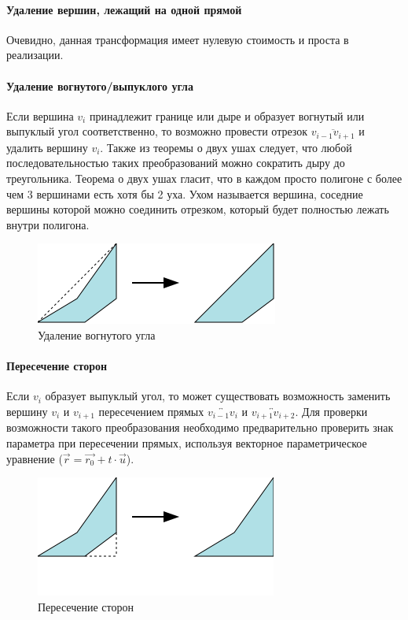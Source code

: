 \documentclass{fefu_thesis/cls/fefu}
\newcommand*\gsegment[1]{\overline{#1}}
\newcommand*\gline[1]{\overleftrightarrow{#1}}
\begin{document}
    \paragraph{Удаление вершин, лежащий на одной прямой}
    Очевидно, данная трансформация имеет нулевую стоимость и проста в реализации.
    \paragraph{Удаление вогнутого/выпуклого угла}
    Если вершина $v_i$ принадлежит границе или дыре и образует вогнутый или выпуклый угол соответственно, то возможно провести отрезок $\gsegment{v_{i - 1}v_{i + 1}}$ и удалить вершину $v_i$. Также из теоремы о двух ушах следует, что любой последовательностью  таких преобразований можно сократить дыру до треугольника. Теорема о двух ушах гласит, что в каждом просто полигоне с более чем 3 вершинами есть хотя бы 2 уха. Ухом называется вершина, соседние вершины которой можно соединить отрезком, который будет полностью лежать внутри полигона.

    \begin{figure}[H]
        \centering
        \includegraphics[scale=1]{images/earcut.png}
        \caption{Удаление вогнутого угла}
    \end{figure}
    \paragraph{Пересечение сторон}
    Если $v_i$ образует выпуклый угол, то может существовать возможность заменить вершину $v_i$ и $v_{i + 1}$ пересечением прямых $\gline{v_{i - 1}v_i}$ и $\gline{v_{i + 1}v_{i + 2}}$. Для проверки возможности такого преобразования необходимо предварительно проверить знак параметра при пересечении прямых, используя векторное параметрическое уравнение ($\vec{r} = \vec{r_0} + t \cdot \vec{u}$).

    \begin{figure}[H]
        \centering
        \includegraphics[scale=1]{images/bendneighbor2.png}
        \caption{Пересечение сторон}
    \end{figure}
\end{document}
